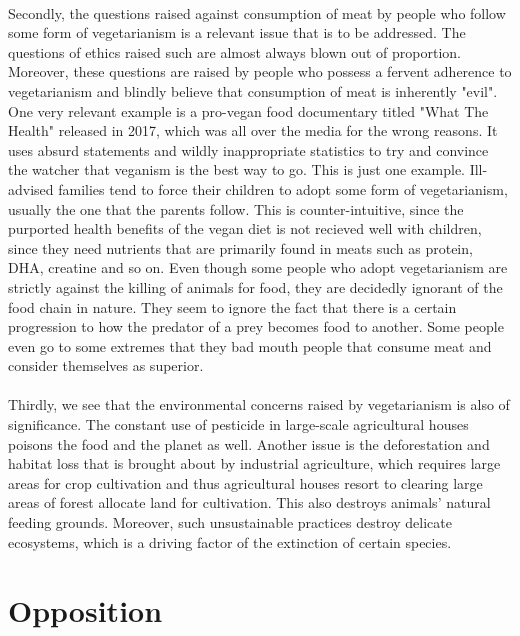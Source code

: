 \documentclass{article}
\begin{document}
\paragraph{} Secondly, the questions raised against consumption of meat by people who follow some form of vegetarianism is a relevant issue that is to be addressed. The questions of ethics raised such are almost always blown out of proportion. Moreover, these questions are raised by people who possess a fervent adherence to vegetarianism and blindly believe that consumption of meat is inherently "evil". One very relevant example is a pro-vegan food documentary titled "What The Health" released in 2017, which was all over the media for the wrong reasons. It uses absurd statements and wildly inappropriate statistics to try and convince the watcher that veganism is the best way to go.\cite{wthdoc} This is just one example. Ill-advised families tend to force their children to adopt some form of vegetarianism, usually the one that the parents follow. This is counter-intuitive, since the purported health benefits of the vegan diet is not recieved well with children, since they need nutrients that are primarily found in meats such as protein, DHA, creatine and so on. Even though some people who adopt vegetarianism are strictly against the killing of animals for food, they are decidedly ignorant of the food chain in nature. They seem to ignore the fact that there is a certain progression to how the predator of a prey becomes food to another. Some people even go to some extremes that they bad mouth people that consume meat and consider themselves as superior.

\paragraph{} Thirdly, we see that the environmental concerns raised by vegetarianism is also of significance. The constant use of pesticide in large-scale agricultural houses poisons the food and the planet as well. Another issue is the deforestation and habitat loss that is brought about by industrial agriculture\cite{vegenv2}, which requires large areas for crop cultivation and thus agricultural houses resort to clearing large areas of forest allocate land for cultivation. This also destroys animals' natural feeding grounds. Moreover, such unsustainable practices destroy delicate ecosystems\cite{vegenv}, which is a driving factor of the extinction of certain species.

\section{Opposition}
\end{document}
